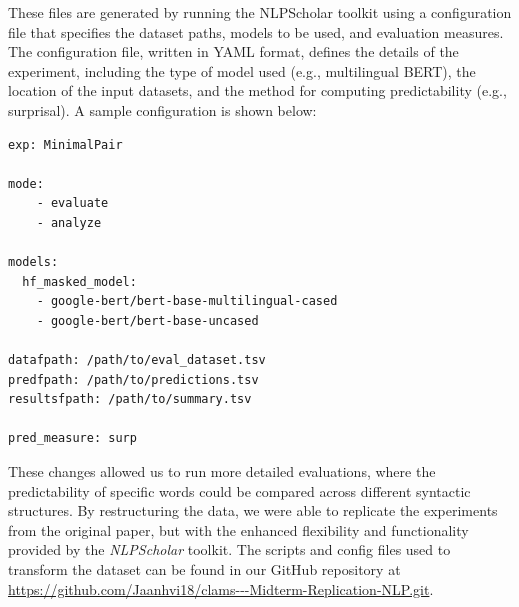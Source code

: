 \documentclass[11pt]{article}
\newcommand{\advice}[1]{\textcolor{MediumPurple}{[#1]}}
\begin{document}
These files are generated by running the NLPScholar toolkit using a configuration file that specifies the dataset paths, models to be used, and evaluation measures. The configuration file, written in YAML format, defines the details of the experiment, including the type of model used (e.g., multilingual BERT), the location of the input datasets, and the method for computing predictability (e.g., surprisal). A sample configuration is shown below:
\begin{lstlisting}[caption={NLPScholar Configuration Example}, label={lst:config}]
exp: MinimalPair

mode: 
    - evaluate
    - analyze
    
models:
  hf_masked_model:
    - google-bert/bert-base-multilingual-cased
    - google-bert/bert-base-uncased      
    
datafpath: /path/to/eval_dataset.tsv
predfpath: /path/to/predictions.tsv
resultsfpath: /path/to/summary.tsv

pred_measure: surp
\end{lstlisting}


These changes allowed us to run more detailed evaluations, where the predictability of specific words could be compared across different syntactic structures. By restructuring the data, we were able to replicate the experiments from the original paper, but with the enhanced flexibility and functionality provided by the \textit{NLPScholar} toolkit. The scripts and config files used to transform the dataset can be found in our GitHub repository at \url{https://github.com/Jaanhvi18/clams---Midterm-Replication-NLP.git}.



\end{document}

